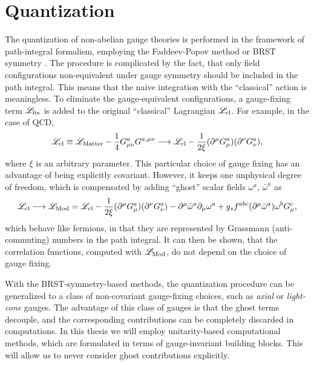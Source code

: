 \section{Quantization}
\label{sec:quant-gauge-fixing}

The quantization of non-abelian gauge theories is performed in
the framework of path-integral formalism,
employing the Faddeev-Popov method \cite{Faddeev:1967fc} or 
BRST symmetry \cite{Becchi:1975nq,Tyutin:1975qk}.
The procedure is complicated by the fact, that only 
field configurations non-equivalent under gauge symmetry should be included in the path integral.
This means that the naive integration with the ``classical'' action is meaningless.
To eliminate the gauge-equivalent configurations, a gauge-fixing term ${\mathscr{L}}_\text{fix} $ is added to the original
``classical'' Lagrangian ${\mathscr{L}}_\text{cl} $.
For example, in the case of QCD,
\begin{equation}
    {\mathscr{L}}_\text{cl} \equiv {\mathscr{L}}_{\text{Matter}}  -  \frac{1}{4}G^a_{\mu\nu}G^{a,\mu\nu}   \longrightarrow {\mathscr{L}}_\text{cl}  - \frac{1}{2\xi}(\partial^\mu G_\mu^a)(\partial^\nu G_\nu^a),
\end{equation}
where $\xi$ is an arbitrary parameter. This particular choice of gauge fixing has an advantage of being explicitly covariant.
However, it keeps one unphysical degree of freedom, which is compensated by adding ``ghost'' scalar fields $\omega^a$, $\bar\omega^a$ as
\begin{equation}
    {\mathscr{L}}_\text{cl} \longrightarrow {\mathscr{L}}_\text{Mod}  = {\mathscr{L}}_\text{cl}  - \frac{1}{2\xi}(\partial^\mu G_\mu^a)(\partial^\nu G_\nu^a) - \partial^\mu \bar{\omega}^a \partial_\mu \omega^a + g_s f^{abc}\qty(\partial^\mu \bar{\omega}^a) \omega^b G_\mu^c, 
\end{equation}
which behave like fermions, in that they are represented by Grassmann (anti-commuting) numbers in the path integral.
It can then be shown, that the correlation functions, computed with ${\mathscr{L}}_\text{Mod} $, do not depend on the choice of gauge fixing.

With the BRST-symmetry-based methods, the quantization procedure can be generalized 
to a class of non-covariant gauge-fixing choices, such as \emph{axial} or \emph{light-cone} gauges.
The advantage of this class of  gauges is that the ghost terms decouple, and the corresponding contributions can be completely discarded in computations.
In this thesis we will employ unitarity-based computational methods, which are  formulated in terms of gauge-invariant building blocks.
This will allow us to never consider ghost contributions explicitly.

